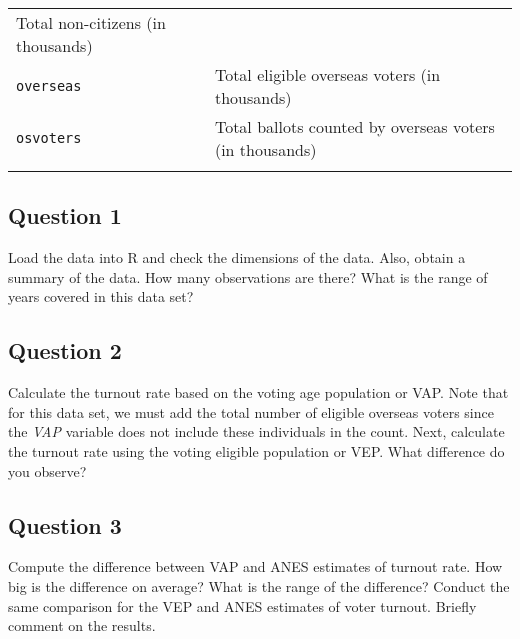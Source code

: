 \documentclass[]{article}
\begin{document}
\begin{longtable}[c]{@{}ll@{}}
\begin{minipage}[t]{0.68\columnwidth}
Total non-citizens (in thousands)
\end{minipage}
\\\addlinespace
\begin{minipage}[t]{0.25\columnwidth}\raggedright
\texttt{overseas}
\end{minipage} & \begin{minipage}[t]{0.68\columnwidth}\raggedright
Total eligible overseas voters (in thousands)
\end{minipage}
\\\addlinespace
\begin{minipage}[t]{0.25\columnwidth}\raggedright
\texttt{osvoters}
\end{minipage} & \begin{minipage}[t]{0.68\columnwidth}\raggedright
Total ballots counted by overseas voters (in thousands)
\end{minipage}
\\\addlinespace
\bottomrule
\end{longtable}

\subsection{Question 1}\label{question-1}

Load the data into R and check the dimensions of the data. Also, obtain
a summary of the data. How many observations are there? What is the
range of years covered in this data set?

\subsection{Question 2}\label{question-2}

Calculate the turnout rate based on the voting age population or VAP.
Note that for this data set, we must add the total number of eligible
overseas voters since the \emph{VAP} variable does not include these
individuals in the count. Next, calculate the turnout rate using the
voting eligible population or VEP. What difference do you observe?

\subsection{Question 3}\label{question-3}

Compute the difference between VAP and ANES estimates of turnout rate.
How big is the difference on average? What is the range of the
difference? Conduct the same comparison for the VEP and ANES estimates
of voter turnout. Briefly comment on the results.
\end{document}
